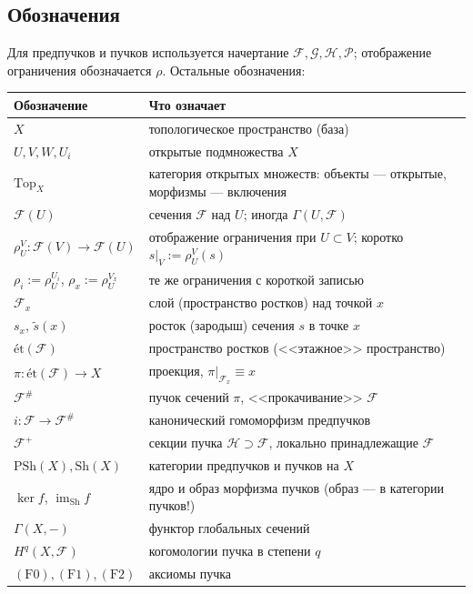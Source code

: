 \documentclass[11pt,b5paper]{article}
\newcommand{\et}{\text{ét}}
\newcommand{\Sh}{\mathrm{Sh}}
\newcommand{\PSh}{\mathrm{PSh}}
\newcommand{\Shv}[1]{\mathscr{#1}}   %
\newcommand{\Top}{\mathrm{Top}}
\newcommand{\res}{\rho}              %
\theoremstyle{plain}
\theoremstyle{definition}
\theoremstyle{remark}
\theoremstyle{definition}
\let\brutsubsection\subsection
\renewcommand{\subsection}{\Needspace{5\baselineskip}\brutsubsection}
\begin{document}
\subsection{Обозначения}
Для предпучков и пучков используется начертание $\Shv{F},\Shv{G},
\Shv{H},\Shv{P}$; отображение ограничения обозначается $\res$.
Остальные обозначения:

\begin{center}
\small
\renewcommand{\arraystretch}{1.25}
\begin{tabular}{@{}>{\raggedright\arraybackslash}p{}%
                >{\raggedright\arraybackslash}p{}@{}}
\toprule
Обозначение & Что означает \\
\midrule
$X$ & топологическое пространство (база) \\
$U,V,W,U_i$ & открытые подмножества $X$ \\
$\Top_X$ & категория открытых множеств: объекты --- открытые,
  морфизмы --- включения \\
$\Shv{F}(U)$ & сечения $\Shv{F}$ над $U$; иногда $\Gamma(U,\Shv{F})$ \\
$\res^{V}_{U}\colon\Shv{F}(V)\to\Shv{F}(U)$ &
  отображение ограничения при $U\subset V$; коротко
  $s|_{V}:=\res^{V}_{U}(s)$ \\
$\res_i:=\res^{U_i}_{U}$, $\res_x:=\res^{V_x}_{U}$ &
  те же ограничения с короткой записью \\
$\Shv{F}_x$ & слой (пространство ростков) над точкой $x$ \\
$s_x$, $\tilde s(x)$ & росток (зародыш) сечения $s$ в точке $x$ \\
$\et(\Shv{F})$ & пространство ростков (<<этажное>> пространство) \\
$\pi\colon\et(\Shv{F})\to X$ & проекция, $\pi|_{\Shv{F}_x}\equiv x$ \\
$\Shv{F}^{\#}$ & пучок сечений $\pi$, <<прокачивание>> $\Shv{F}$ \\
$i\colon\Shv{F}\to\Shv{F}^{\#}$ & канонический гомоморфизм предпучков \\
$\Shv{F}^{+}$ & секции пучка $\Shv{H}\supset\Shv{F}$, локально
  принадлежащие $\Shv{F}$ \\
$\PSh(X),\Sh(X)$ & категории предпучков и пучков на $X$ \\
$\ker f$, $\operatorname{im}_{\Sh}f$ & ядро и образ морфизма пучков
  (образ --- в категории пучков!) \\
$\Gamma(X,-)$ & функтор глобальных сечений \\
$H^q(X,\Shv{F})$ & когомологии пучка в степени $q$ \\
$(\mathrm{F0}),(\mathrm{F1}),(\mathrm{F2})$ & аксиомы пучка \\
\bottomrule
\end{tabular}
\end{center}
\end{document}

